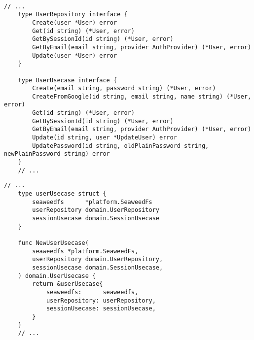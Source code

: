  \\

    \begin{lstlisting}[label={lst:appendix-user-domain}, caption={Snippets of "User Repository" interface and "User" usercase's definition}]
    // ...
    type UserRepository interface {
        Create(user *User) error
        Get(id string) (*User, error)
        GetBySessionId(id string) (*User, error)
        GetByEmail(email string, provider AuthProvider) (*User, error)
        Update(user *User) error
    }
    
    type UserUsecase interface {
        Create(email string, password string) (*User, error)
        CreateFromGoogle(id string, email string, name string) (*User, error)
        Get(id string) (*User, error)
        GetBySessionId(id string) (*User, error)
        GetByEmail(email string, provider AuthProvider) (*User, error)
        Update(id string, user *UpdateUser) error
        UpdatePassword(id string, oldPlainPassword string, newPlainPassword string) error
    }
    // ...
    \end{lstlisting}
    
    \begin{lstlisting}[label={lst:appendix-user-usecase}, caption={Snippets of "User" Usecase implementation of UserRepository}]
    // ...
    type userUsecase struct {
        seaweedfs      *platform.SeaweedFs
        userRepository domain.UserRepository
        sessionUsecase domain.SessionUsecase
    }
    
    func NewUserUsecase(
        seaweedfs *platform.SeaweedFs,
        userRepository domain.UserRepository,
        sessionUsecase domain.SessionUsecase,
    ) domain.UserUsecase {
        return &userUsecase{
            seaweedfs:      seaweedfs,
            userRepository: userRepository,
            sessionUsecase: sessionUsecase,
        }
    }
    // ...
    \end{lstlisting}
    
\pagebreak